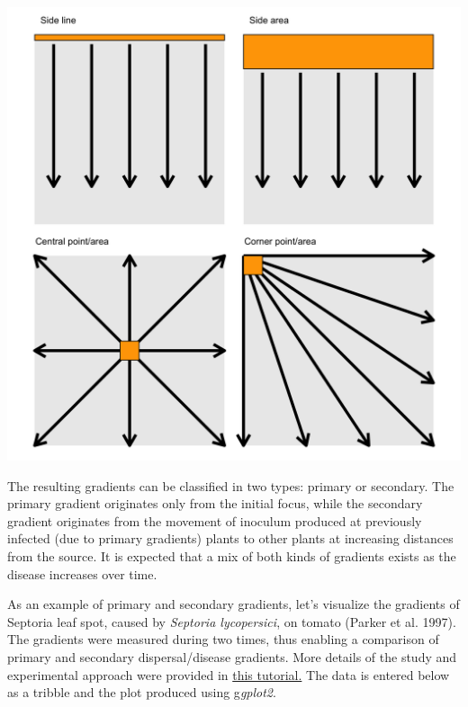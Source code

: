 \documentclass[
  letterpaper,
  DIV=11,
  numbers=noendperiod]{scrreprt}
\begin{document}
\includegraphics[width=6.08333in,height=\textheight]{./imgs/gradients.png}

The resulting gradients can be classified in two types: primary or
secondary. The primary gradient originates only from the initial focus,
while the secondary gradient originates from the movement of inoculum
produced at previously infected (due to primary gradients) plants to
other plants at increasing distances from the source. It is expected
that a mix of both kinds of gradients exists as the disease increases
over time.

As an example of primary and secondary gradients, let's visualize the
gradients of Septoria leaf spot, caused by \emph{Septoria lycopersici},
on tomato (Parker et al. 1997). The gradients were measured during two
times, thus enabling a comparison of primary and secondary
dispersal/disease gradients. More details of the study and experimental
approach were provided in
\href{https://www.apsnet.org/edcenter/disimpactmngmnt/topc/EcologyAndEpidemiologyInR/ModelingDispersalGradients/Pages/PrimaryandSecondaryGradients.aspx}{this
tutorial.} The data is entered below as a tribble and the plot produced
using g\emph{gplot2}.
\end{document}
